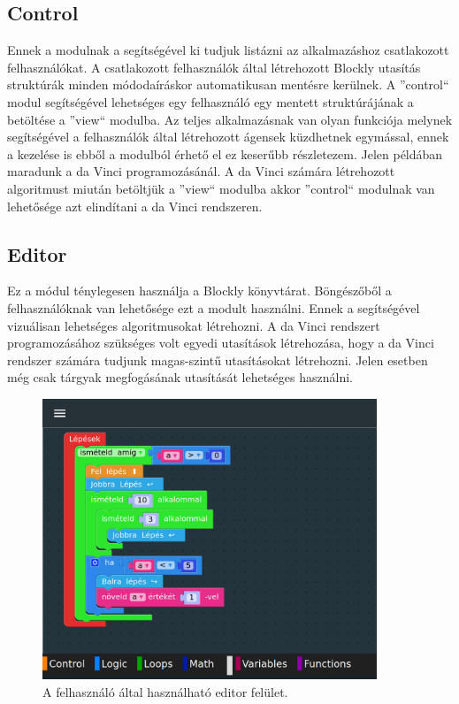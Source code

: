 \documentclass[12pt,a4paper,oneside]{report} %
\begin{document}
\subsection{Control}
Ennek a modulnak a segítségével ki tudjuk listázni az alkalmazáshoz csatlakozott felhasználókat. A csatlakozott felhasználók által létrehozott Blockly utasítás struktúrák minden módodaíráskor automatikusan mentésre kerülnek. A ''control`` modul segítségével lehetséges egy felhasználó egy mentett struktúrájának a betöltése a  ''view`` modulba. Az teljes alkalmazásnak van olyan funkciója melynek segítségével a felhasználók által létrehozott ágensek küzdhetnek egymással, ennek a kezelése is ebből a modulból érhető el ez keserűbb részletezem. Jelen példában maradunk a da Vinci programozásánál. A da Vinci számára létrehozott algoritmust miután betöltjük a ''view`` modulba akkor ''control`` modulnak van lehetősége azt elindítani a da Vinci rendszeren. 
\subsection{Editor}
Ez a módul ténylegesen használja a Blockly könyvtárat. Böngészőből a felhasználóknak van lehetősége ezt a modult használni. Ennek a segítségével vizuálisan lehetséges algoritmusokat létrehozni. A da Vinci rendszert programozásához szükséges volt egyedi utasítások létrehozása, hogy a da Vinci rendszer számára tudjunk magas-szintű utasításokat létrehozni. Jelen esetben még csak tárgyak megfogásának utasítását lehetséges használni.
\begin{figure}[H]
	\centering
	\label{fig:myblockly}
	\includegraphics[width=10cm]{myblockly}
	\caption{A felhasználó által használható editor felület. }
\end{figure}
\end{document}
